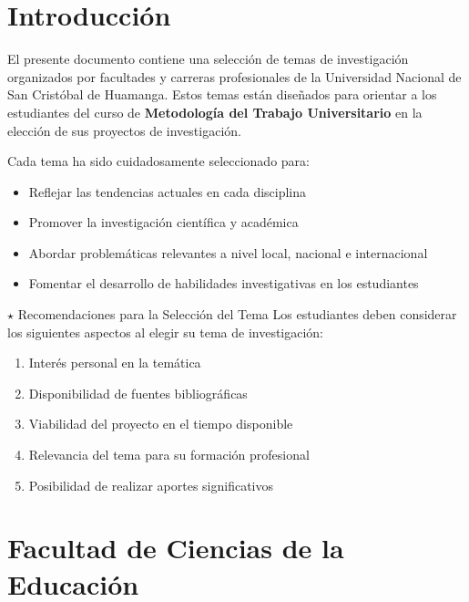 \documentclass[12pt,a4paper]{article}
\begin{document}
\tableofcontents
\newpage

\section*{Introducción}

El presente documento contiene una selección de temas de investigación organizados por facultades y carreras profesionales de la Universidad Nacional de San Cristóbal de Huamanga. Estos temas están diseñados para orientar a los estudiantes del curso de \textbf{Metodología del Trabajo Universitario} en la elección de sus proyectos de investigación.

Cada tema ha sido cuidadosamente seleccionado para:

\begin{itemize}
  \item Reflejar las tendencias actuales en cada disciplina
  \item Promover la investigación científica y académica
  \item Abordar problemáticas relevantes a nivel local, nacional e internacional
  \item Fomentar el desarrollo de habilidades investigativas en los estudiantes
\end{itemize}

\begin{infobox}{$\star$ Recomendaciones para la Selección del Tema}
Los estudiantes deben considerar los siguientes aspectos al elegir su tema de investigación:
\begin{enumerate}
  \item Interés personal en la temática
  \item Disponibilidad de fuentes bibliográficas
  \item Viabilidad del proyecto en el tiempo disponible
  \item Relevancia del tema para su formación profesional
  \item Posibilidad de realizar aportes significativos
\end{enumerate}
\end{infobox}

\newpage

\section{Facultad de Ciencias de la Educación}
\end{document}
